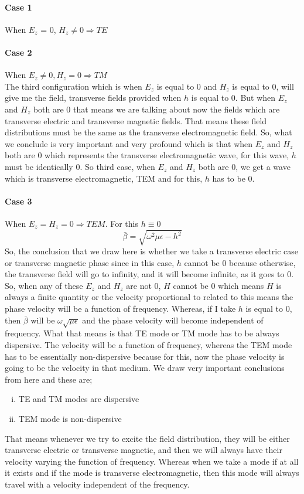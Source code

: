 \paragraph{Case 1}When $E_z$ = 0, $H_z \neq 0 \Rightarrow TE$
\paragraph{Case 2}When $E_z \neq 0, H_z = 0 \Rightarrow TM$\\

The third configuration which is when $E_z$ is equal to 0 and $H_z$ is equal to 0, will give me the field, transverse fields provided when $h$ is equal to 0. But when $E_z$ and $H_z$ both are 0 that means we are talking about now the fields which are transverse electric and transverse magnetic fields. That means these field distributions must be the same as the transverse electromagnetic field.
So, what we conclude is very important and very profound which is that when $E_z$ and $H_z$ both are 0 which represents the transverse electromagnetic wave, for this wave, $h$ must be identically 0. So third case, when $E_z$ and $H_z$ both are 0, we get a wave which is transverse electromagnetic, TEM and for this, $h$ has to be 0.
\paragraph{Case 3}When $E_z = H_z = 0 \Rightarrow TEM$. For this $h \equiv 0$
\begin{dmath*}
\bar{\beta} = \sqrt{\omega^2\mu\epsilon - h^2}
\end{dmath*}
So, the conclusion that we draw here is whether we take a transverse electric case or transverse magnetic phase since in this case, $h$ cannot be 0 because otherwise, the transverse field will go to infinity, and it will become infinite, as it goes to 0. So, when any of these  $E_z$ and $H_z$ are not 0, $H$ cannot be 0 which means $H$ is always a finite quantity or the velocity proportional to related to this means the phase velocity will be a function of frequency. Whereas, if I take $h$ is equal to 0, then $\bar{\beta}$ will be $\omega \sqrt{\mu\epsilon}$ and the phase velocity will become independent of frequency. What that means is that TE mode or TM mode has to be always dispersive. The velocity will be a function of frequency, whereas the TEM mode has to be essentially non-dispersive because for this, now the phase velocity is going to be the velocity in that medium. We draw very important conclusions from here and these are;
\begin{enumerate}[(i)]
\item TE and TM modes are dispersive
\item TEM mode is non-dispersive
\end{enumerate}
That means whenever we try to excite the field distribution, they will be either transverse electric or transverse magnetic, and then we will always have their velocity varying the function of frequency. Whereas when we take a mode if at all it exists and if the mode is transverse electromagnetic, then this mode will always travel with a velocity independent of the frequency.

